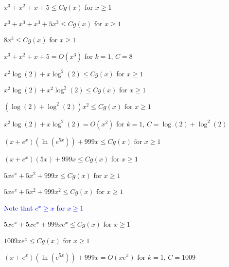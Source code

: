\documentclass{exam}
\begin{document}
\begin{questions}
\begin{center}
\end{center}

\newpage

\begin{subparts}

\begin{center}
\( x^3 + x^2 + x + 5 \leq Cg(x) \) for \(x \geq 1\)

\( x^3 + x^3 + x^3 + 5x^3 \leq Cg(x) \) for \(x \geq 1\)

\( 8x^3 \leq Cg(x) \) for \(x \geq 1\)

\( x^3 + x^2 + x + 5 = O(x^3)\) for \(k = 1\), \(C = 8\)
\end{center}


\begin{center}
\( x^2\log(2) + x\log^2(2) \leq Cg(x) \) for \(x \geq 1\)

\( x^2\log(2) + x^2\log^2(2) \leq Cg(x) \) for \(x \geq 1\)

\( (\log(2) + \log^2(2))x^2 \leq Cg(x) \) for \(x \geq 1\)

\( x^2\log(2) + x\log^2(2) = O(x^2)\) for \(k = 1\), \(C = \log(2) + \log^2(2)\)
\end{center}


\begin{center}
\( (x + e^x)(\ln(e^{5x})) + 999x \leq Cg(x) \) for \(x \geq 1\)

\( (x + e^x)(5x) + 999x \leq Cg(x) \) for \(x \geq 1\)

\( 5xe^x + 5x^2 + 999x \leq Cg(x) \) for \(x \geq 1\)

\( 5xe^x + 5x^2 + 999x^2 \leq Cg(x) \) for \(x \geq 1\)
\vspace{5px}

\textcolor{blue}{Note that \(e^x \geq x\) for \(x \geq 1\)}
\vspace{5px}

\( 5xe^x + 5xe^x + 999xe^x \leq Cg(x) \) for \(x \geq 1\)

\( 1009xe^x \leq Cg(x) \) for \(x \geq 1\)

\( (x + e^x)(\ln(e^{5x})) + 999x = O(xe^x)\) for \(k = 1\), \(C = 1009\)
\end{center}



\end{subparts}
\end{questions}
\end{document}
